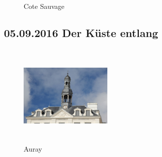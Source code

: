 \begin{figure}[H]
   \centering
   \quad
   \quad
   \quad
   \caption[Cote Sauvage]{Cote Sauvage}
\end{figure}

\subsection{05.09.2016 Der Küste entlang}

\begin{figure} 
  \begin{centering}
    \includegraphics[width=0.4\textwidth, height=5cm, keepaspectratio]{../Bilder/Bretagne/16.jpg}
    \caption{Auray}
  \end{centering}
\end{figure} 

